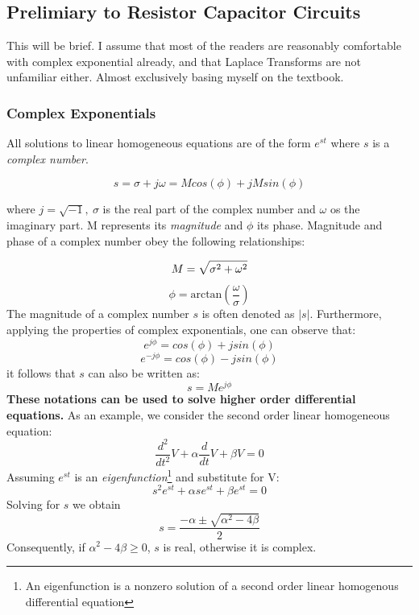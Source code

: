 \subsection{Prelimiary to Resistor Capacitor Circuits}

This will be brief. I assume that most of the readers are reasonably comfortable with complex exponential already, and that Laplace Transforms are not unfamiliar either. Almost exclusively basing myself on the textbook. 

\subsubsection{Complex Exponentials}

All solutions to linear homogeneous equations are of the form $e^{st}$ where $s$ is a \textit{complex number}.

\begin{equation}
    s = \sigma + j\omega = M cos(\phi) + j M sin(\phi)
\end{equation}

where $j = \sqrt{-1},\ \sigma$ is the real part of the complex number and $\omega$ os the imaginary part. M represents its \textit{magnitude} and $\phi$ its phase. Magnitude and phase of a complex number obey the following relationships: 

\begin{equation}
    M = \sqrt{\sigma^2 + \omega^2}\\
\end{equation}
\begin{equation}
    \phi = \mathrm{arctan} (\frac{\omega}{\sigma})
\end{equation}
The magnitude of a complex number $s$ is often denoted as $|s|$. Furthermore,
applying the properties of complex exponentials, one can observe that:
\begin{equation}
    e^{j\phi} = cos(\phi) + j sin(\phi)
\end{equation}
\begin{equation}
    e^{-j\phi} = cos(\phi) - j sin(\phi)
\end{equation}
it follows that $s$ can also be written as: 
\begin{equation}
    s = Me^{j\phi}
\end{equation}
\textbf{These notations can be used to solve higher order differential equations.} As an example, we consider the second order linear homogeneous equation: 
\begin{equation}
    \frac{d^2}{dt^2}V + \alpha \frac{d}{dt}V + \beta V = 0
\end{equation}
Assuming $e^{st}$ is an \textit{eigenfunction}\footnote{An eigenfunction is a nonzero solution of a second order linear homogenous differential equation} and substitute for V: 
\begin{equation}
    s^2e^{st} + \alpha se^{st} + \beta e^{st} = 0
\end{equation}
Solving for $s$ we obtain
\begin{equation}
    s = \frac{-\alpha \pm \sqrt{\alpha^2 -4\beta}}{2}
\end{equation}
Consequently, if $\alpha^2 -4\beta \geq 0$, $s$ is real, otherwise it is complex. 

